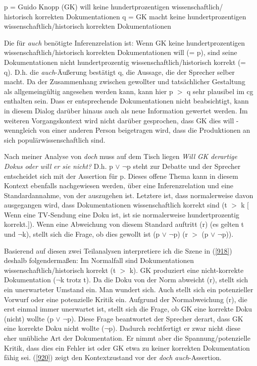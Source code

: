 {\begin{exe}
	\ex\label{919} 
		\begin{xlist}	
			\ex\label{919a} p = Guido Knopp (GK) will keine hundertprozentigen wissenschaftlich/ historisch korrekten Dokumentationen
			\ex\label{919b} q = GK macht keine hundertprozentigen wissenschaftlich/historisch korrekten Dokumentationen
			\hfill\hbox {\citet[42]{Helbig1981}}
		\end{xlist}
\end{exe}
Die für \textit{auch} benötigte Inferenzrelation ist: \glq Wenn GK keine hundertprozentigen wissenschaftlich/historisch korrekten Dokumentationen will (= p), sind seine Dokumentationen nicht hundertprozentig wissenschaftlich/historisch korrekt (= q).\grq {} D.h. die \textit{auch}-Äußerung bestätigt q, die Aussage, die der Sprecher selber macht. Da der Zusammenhang zwischen gewollter und tatsächlicher Gestaltung als allgemeingültig angesehen werden kann, kann hier p $>$ q sehr plausibel im cg enthalten sein. Dass er entsprechende Dokumentationen nicht beabsichtigt, kann in diesem Dialog darüber hinaus auch als neue Information gewertet werden. Im weiteren Vorgangskontext wird nicht darüber gesprochen, dass GK dies will - wenngleich von einer anderen Person beigetragen wird, dass die Produktionen an sich populärwissenschaftlich sind.

Nach meiner Analyse von \textit{doch} muss auf dem Tisch liegen \textit{Will GK derartige Dokus oder will er sie nicht?} D.h. p $\vee$ $\neg$p steht zur Debatte und der Sprecher entscheidet sich mit der Assertion für p. Dieses offene Thema kann in diesem Kontext ebenfalls nachgewiesen werden, über eine Inferenzrelation  und eine Standardannahme, von der auszugehen ist. Letztere ist, dass normalerweise davon ausgegangen wird, dass Dokumentationen wissenschaftlich korrekt sind (t $>$ k $[$\glq Wenn eine TV-Sendung eine Doku ist, ist sie normalerweise hundertprozentig korrekt.\grq {}$]$). Wenn eine Abweichung von diesem Standard auftritt (r) (es gelten t und $\neg$k), stellt sich die Frage, ob dies gewollt ist (p $\vee$ $\neg$p) (r $>$ (p $\vee$ $\neg$p)).

Basierend auf diesen zwei Teilanalysen interpretiere ich die Szene in (\ref{918}) des\-halb folgendermaßen: Im Normalfall sind Dokumentationen wissenschaftlich/his\-torisch korrekt (t $>$ k). GK produziert eine nicht-korrekte Dokumentation ($\neg$k trotz t). Da die Doku von der Norm abweicht (r), stellt sich ein unerwarteter Umstand ein. Man wundert sich. Auch stellt sich ein potenzieller Vorwurf oder eine potenzielle Kritik ein. Aufgrund der Normabweichung (r), die erst einmal immer unerwartet ist, stellt sich die Frage, ob GK eine korrekte Doku (nicht) wollte (p $\vee$ $\neg$p). Diese Frage beantwortet der Sprecher derart, dass GK eine korrekte Doku nicht wollte ($\neg$p). Dadurch rechtfertigt er zwar nicht diese eher unübliche Art der Dokumentation. Er nimmt aber die Spannung/potenzielle Kritik, dass dies ein Fehler ist oder GK etwa zu keiner korrekten Dokumentation fähig sei. (\ref{920}) zeigt den Kontextzustand vor der \textit{doch auch}-Assertion.

}
